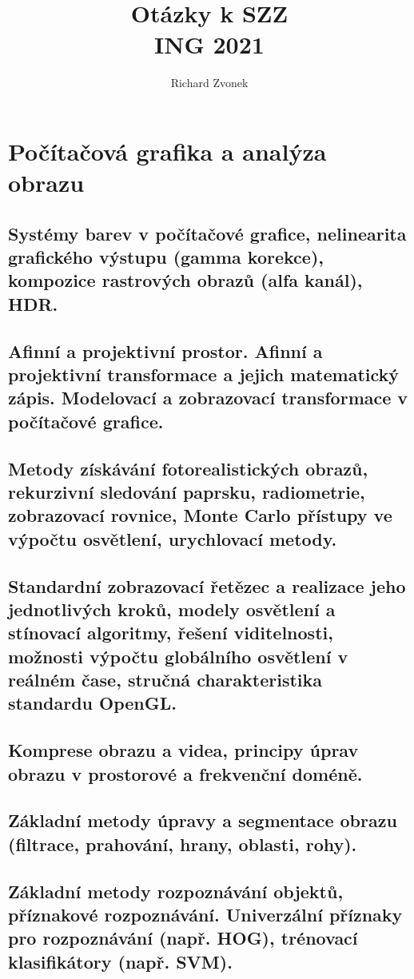 \documentclass[openany]{book}
\title{Otázky k SZZ\\ING 2021}
\author{Richard Zvonek}
\begin{document}
\tableofcontents

\chapter{Počítačová grafika a analýza obrazu}
\section{Systémy barev v počítačové grafice, nelinearita grafického výstupu (gamma korekce), kompozice rastrových obrazů (alfa kanál), HDR.}

\section{Afinní a projektivní prostor. Afinní a projektivní transformace a jejich matematický zápis. Modelovací a zobrazovací transformace v počítačové grafice.}

\section{Metody získávání fotorealistických obrazů, rekurzivní sledování paprsku, radiometrie, zobrazovací rovnice, Monte Carlo přístupy ve výpočtu osvětlení, urychlovací metody.}

\section{Standardní zobrazovací řetězec a realizace jeho jednotlivých kroků, modely osvětlení a stínovací algoritmy, řešení viditelnosti, možnosti výpočtu globálního osvětlení v reálném čase, stručná charakteristika standardu OpenGL.}

\section{Komprese obrazu a videa, principy úprav obrazu v prostorové a frekvenční doméně.}

\section{Základní metody úpravy a segmentace obrazu (filtrace, prahování, hrany, oblasti, rohy).}

\section{Základní metody rozpoznávání objektů, příznakové rozpoznávání. Univerzální příznaky pro rozpoznávání (např. HOG), trénovací klasifikátory (např. SVM).}
\end{document}
